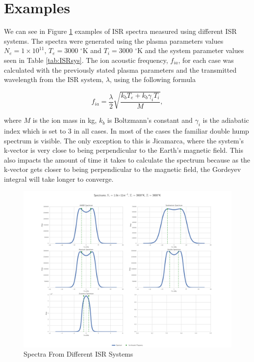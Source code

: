 \section{Examples}
We can see in Figure \ref{fig:diffspectrums} examples of ISR spectra measured using different ISR systems. The spectra were generated using the plasma parameters values $N_e=1\times10^{11}$, $T_e=$3000 $^\circ$K and $T_i=$3000 $^\circ$K and the system parameter values seen in Table \ref{tab:ISRsys}. The ion acoustic frequency, $f_{ia}$, for each case was calculated with the previously stated plasma parameters  and the transmitted wavelength from the ISR system, $\lambda$, using the following formula

\begin{equation}
\label{eq:iaf}
f_{ia} = \frac{\lambda}{2}\sqrt{\frac{k_bT_e +k_b\gamma_iT_i}{M}},
\end{equation}

\noindent where $M$ is the ion mass in kg, $k_b$ is Boltzmann's constant and $\gamma_i$ is the adiabatic index which is set to 3 in all cases. In most of the cases the familiar double hump spectrum is visible. The only exception to this is Jicamarca, where the system's k-vector is very close to being perpendicular to the Earth's magnetic field. This also impacts the amount of time it takes to calculate the spectrum because as the k-vector gets closer to being perpendicular to the magnetic field, the Gordeyev integral will take longer to converge.
\begin{figure}[!h]
\centering
\includegraphics[width=6.0in]{DifferentSystems}

\caption{Spectra From Different ISR Systems}
\label{fig:diffspectrums}
\end{figure}


